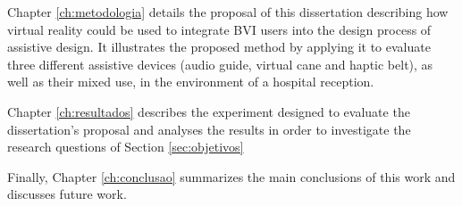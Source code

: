 Chapter \ref{ch:metodologia} details the proposal of this dissertation describing how virtual reality could be used to integrate BVI users into the design process of assistive design. It illustrates the proposed method by applying it to evaluate three different assistive devices (audio guide, virtual cane and haptic belt), as well as their mixed use, in the environment of a hospital reception. 

Chapter \ref{ch:resultados} describes the experiment designed to evaluate the dissertation’s proposal and analyses the results in order to investigate the research questions of Section \ref{sec:objetivos}

Finally, Chapter \ref{ch:conclusao} summarizes the main conclusions of this work and discusses future work.
